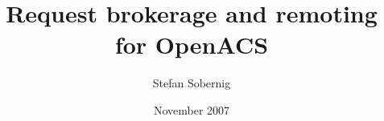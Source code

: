 
  
\title{Request brokerage and remoting for OpenACS}
\author{Stefan Sobernig}
\date{November 2007}
\maketitle
\renewcommand{\contentsname}{}
\tableofcontents 









 \newpage
 
 \newpage
    